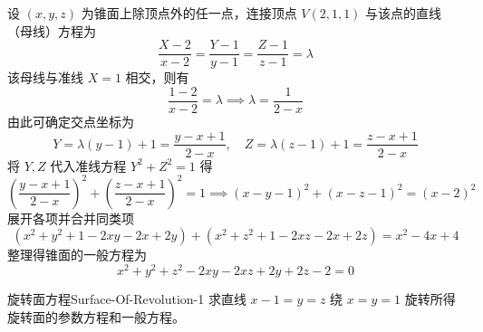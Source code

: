 \begin{solution}
    设 $(x, y, z)$ 为锥面上除顶点外的任一点，连接顶点 $V(2, 1, 1)$ 与该点的直线（母线）方程为
    \begin{equation*}
        \frac{X - 2}{x - 2} = \frac{Y - 1}{y - 1} = \frac{Z - 1}{z - 1} = \lambda
    \end{equation*}
    该母线与准线 $X = 1$ 相交，则有
    \begin{equation*}
        \frac{1 - 2}{x - 2} = \lambda \implies \lambda = \frac{1}{2 - x}
    \end{equation*}
    由此可确定交点坐标为
    \begin{equation*}
        Y = \lambda(y - 1) + 1 = \frac{y - x + 1}{2 - x}, \quad Z = \lambda(z - 1) + 1 = \frac{z - x + 1}{2 - x}
    \end{equation*}
    将 $Y, Z$ 代入准线方程 $Y^2 + Z^2 = 1$ 得
    \begin{equation*}
        \left(\frac{y - x + 1}{2 - x}\right)^2 + \left(\frac{z - x + 1}{2 - x}\right)^2 = 1 \implies (x - y - 1)^2 + (x - z - 1)^2 = (x - 2)^2
    \end{equation*}
    展开各项并合并同类项
    \begin{equation*}
        (x^2 + y^2 + 1 - 2xy - 2x + 2y) + (x^2 + z^2 + 1 - 2xz - 2x + 2z) = x^2 - 4x + 4
    \end{equation*}
    整理得锥面的一般方程为
    \begin{equation*}
        \boxed{x^2 + y^2 + z^2 - 2xy - 2xz + 2y + 2z - 2 = 0}
    \end{equation*}
\end{solution}


\begin{problem}{旋转面方程}{Surface-Of-Revolution-1}
    求直线 $x - 1 = y = z$ 绕 $x = y = 1$ 旋转所得旋转面的参数方程和一般方程。
\end{problem}

